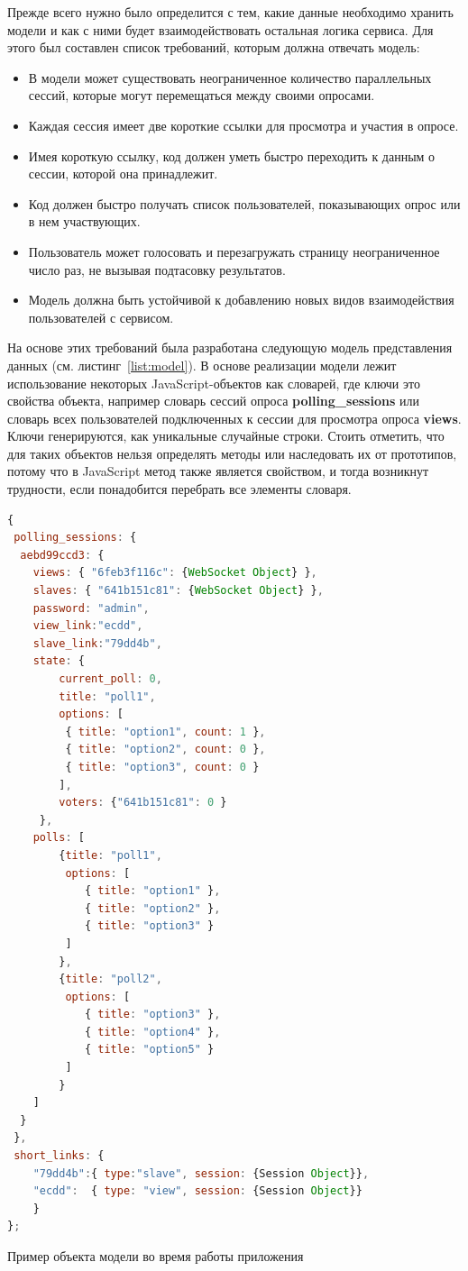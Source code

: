 Прежде всего нужно было определится с тем, какие данные необходимо хранить модели и как с ними будет взаимодействовать остальная логика сервиса. Для этого был составлен список требований, которым должна отвечать модель:
 
\begin{itemize}
 \item В модели может существовать неограниченное количество параллельных сессий, которые могут перемещаться между своими опросами.
 \item Каждая сессия имеет две короткие ссылки для просмотра и участия в опросе. 
 \item Имея короткую ссылку, код должен уметь быстро переходить к данным о сессии, которой она принадлежит.
 \item Код должен быстро получать список пользователей, показывающих опрос или в нем участвующих.
 \item Пользователь может голосовать и перезагружать страницу неограниченное число раз, не вызывая подтасовку результатов.
 \item Модель должна быть устойчивой к добавлению новых видов взаимодействия пользователей с сервисом.
\end{itemize}
 
На основе этих требований была разработана следующую модель представления данных (см. листинг~\ref{list:model}). В основе реализации модели лежит использование некоторых JavaScript-объектов как словарей, где ключи это свойства объекта, например словарь сессий опроса \textbf{polling\_sessions} или словарь всех пользователей подключенных к сессии для просмотра опроса \textbf{views}. Ключи генерируются, как уникальные случайные строки. Стоить отметить, что для таких объектов нельзя определять методы или наследовать их от прототипов, потому что в JavaScript метод также является свойством, и тогда возникнут трудности, если понадобится перебрать все элементы словаря. 
 
\begin{ListingEnv}
\begin{lstlisting}[language=JavaScript]
{
 polling_sessions: {
  aebd99ccd3: {
	views: { "6feb3f116c": {WebSocket Object} },
	slaves: { "641b151c81": {WebSocket Object} },
	password: "admin",
	view_link:"ecdd",
	slave_link:"79dd4b",
	state: {
		current_poll: 0,
		title: "poll1",
		options: [
		 { title: "option1", count: 1 },
		 { title: "option2", count: 0 },
		 { title: "option3", count: 0 }
		],
		voters: {"641b151c81": 0 }
	 },
	polls: [
		{title: "poll1",
		 options: [
		 	{ title: "option1" },
			{ title: "option2" },
			{ title: "option3" }
		 ]
		},
		{title: "poll2",
		 options: [
			{ title: "option3" },
			{ title: "option4" },
			{ title: "option5" }
		 ]
		}
	]
  }
 },
 short_links: {
	"79dd4b":{ type:"slave", session: {Session Object}},
	"ecdd":	 { type: "view", session: {Session Object}}
	}
};
\end{lstlisting}
\caption{Пример объекта модели во время работы приложения}
\label{list:model}
\end{ListingEnv}
 
